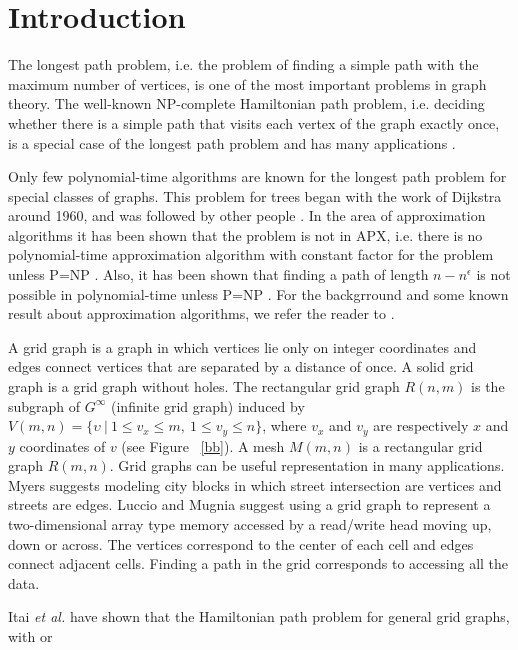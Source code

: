 \documentclass[preprint,12pt]{elsarticle}
\begin{document}
\section{Introduction}\label{IntroSect}
The longest path problem, i.e. the problem of finding a simple path
with the maximum number of vertices, is one of the most important
problems in graph theory. The well-known NP-complete Hamiltonian
path problem, i.e. deciding whether there is a simple path that
visits each vertex of the graph exactly once, is a special case of
the longest path problem and has many applications \cite{D:GT,
GJ:CAI}. \par Only few polynomial-time algorithms are known for the
longest path problem for special classes of graphs. This problem for
trees began with the work of Dijkstra around 1960, and was followed
by other people \cite{BSZVGF:OCALPIAT, G:FALPIACMD, LMN:TLPPIPOIG,
MC:ASPAFTLPPOCG, UU:OCLPISGC}.
In the area of approximation
algorithms it has been shown that the problem is not in APX, i.e.
there is no polynomial-time approximation algorithm with constant
factor for the problem unless P=NP \cite{G:FALPIACMD}. Also, it has
been shown that finding a path of length $n-n^{\epsilon}$ is not
possible in polynomial-time unless P=NP \cite{KMR:OATLPIAG}. For the
backgrround and some known result about approximation algorithms, we
refer the reader to \cite{BH:FAPOSL, GN:FLPCAC, ZL:AFLPIG}.\par A
grid graph is a graph in which vertices lie only on integer
coordinates and edges connect vertices that are separated by a
distance of once. A solid grid graph is a grid graph without holes.
The rectangular grid graph $R(n,m)$ is the subgraph of $G^\infty$
(infinite grid graph) induced by $V(m,n)= \{\upsilon \ |\ 1 \leq
v_{x}\leq m, \ 1\leq v_{y}\leq n\}$, where $v_{x}$ and $v_{y}$ are
respectively $x$ and $y$ coordinates of $v$ (see Figure ~\ref{bb}).
A mesh $M(m,n)$ is a rectangular grid graph $R(m,n)$. Grid graphs
can be useful representation in many applications. Myers \cite{M}
suggests modeling city blocks in which street intersection are
vertices and streets are edges. Luccio and Mugnia \cite{LM:HPOARC}
suggest using a grid graph to represent a two-dimensional array type
memory accessed by a read/write head moving up, down or across. The
vertices correspond to the center of each cell and edges connect
adjacent cells. Finding a path in the grid corresponds to accessing
all the data.\par Itai \textit{et al.} \cite{IPS:HPIGG} have shown
that the Hamiltonian path problem for general grid graphs, with or
\end{document}
